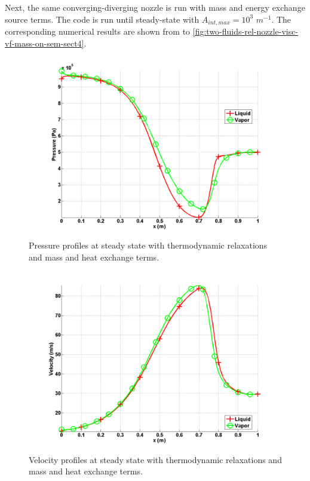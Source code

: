 Next, the same converging-diverging nozzle is run with mass and energy exchange source terms. The code is run until steady-state with $A_{int,max}=10^3$ $m^{-1}$. The corresponding numerical results are shown from  to \ref{fig:two-fluids-rel-nozzle-visc-vf-mass-on-sem-sect4}.
%
\begin{figure}[H]
\centering
\includegraphics[width=\textwidth]{figures/SEM/Aint1e3MassOn_two_phases_pressure.png}
\caption{Pressure profiles at steady state with thermodynamic relaxations and mass and heat exchange terms.}
\label{fig:two-fluids-rel-nozzle-press-mass-on-sem-sect4}
\end{figure}
%
\begin{figure}[H]
\centering
\includegraphics[width=\textwidth]{figures/SEM/Aint1e3MassOn_two_phases_velocity.png}
\caption{Velocity profiles at steady state with thermodynamic relaxations and mass and heat exchange terms.}
\label{fig:two-fluids-rel-nozzle-vel-mass-on-sem-sect4}
\end{figure}
